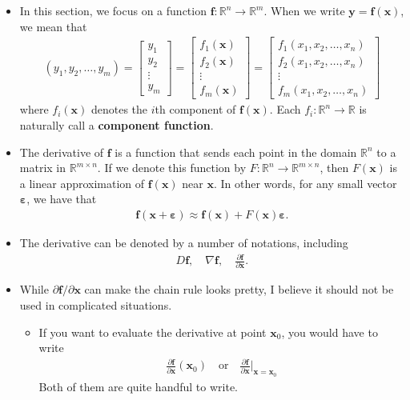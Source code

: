 \documentclass[10pt]{article}
\newcommand{\ve}[1]{\mathbf{#1}}
\newcommand{\ves}[1]{\boldsymbol{#1}}
\newcommand{\Real}{\mathbb{R}}
\begin{document}
\begin{itemize}
  \item In this section, we focus on a function $\ve{f}: \Real^n \rightarrow \Real^m$. When we write $\ve{y} = \ve{f}(\ve{x})$, we mean that
  \begin{align*}
    (y_1, y_2, \dotsc, y_m)
    = \begin{bmatrix}
      y_1 \\
      y_2 \\
      \vdots \\
      y_m
    \end{bmatrix}
    = \begin{bmatrix}
      f_1(\ve{x}) \\
      f_2(\ve{x}) \\
      \vdots \\
      f_m(\ve{x})
    \end{bmatrix}
    = \begin{bmatrix}
      f_1(x_1, x_2, \dotsc, x_n) \\
      f_2(x_1, x_2, \dotsc, x_n) \\
      \vdots \\
      f_m(x_1, x_2, \dotsc, x_n)
    \end{bmatrix}
  \end{align*}
  where $f_i(\ve{x})$ denotes the $i$th component of $\ve{f}(\ve{x})$. Each $f_i: \Real^n \rightarrow \Real$ is naturally call a {\bf component function}.

  \item The derivative of $\ve{f}$ is a function that sends each point in the domain $\Real^n$ to a matrix in $\Real^{m \times n}$. If we denote this function by $F: \Real^n \rightarrow \Real^{m \times n}$, then $F(\ve{x})$ is a linear approximation of $\ve{f}(\ve{x})$ near $\ve{x}$. In other words, for any small vector $\ves{\varepsilon}$, we have that
  \begin{align*}
    \ve{f}(\ve{x} + \ves{\varepsilon}) \approx \ve{f}(\ve{x}) + F(\ve{x}) \ves{\varepsilon}.
  \end{align*}

  \item The derivative can be denoted by a number of notations, including
  \begin{align*}
    D\ve{f}, \quad \nabla \ve{f}, \quad \frac{\partial \ve{f}}{\partial \ve{x}}.
  \end{align*}
  
  \item While $\partial \ve{f} / \partial \ve{x}$ can make the chain rule looks pretty, I believe it should not be used in complicated situations.
  \begin{itemize}
    \item If you want to evaluate the derivative at point $\ve{x}_0$, you would have to write
    \begin{align*}
      \frac{\partial \ve{f}}{\partial \ve{x}}(\ve{x}_0)
      \quad \mbox{or} \quad \frac{\partial \ve{f}}{\partial \ve{x}}\bigg|_{\ve{x} = \ve{x}_0}
    \end{align*}
    Both of them are quite handful to write.


\end{itemize}
\end{itemize}
\end{document}
